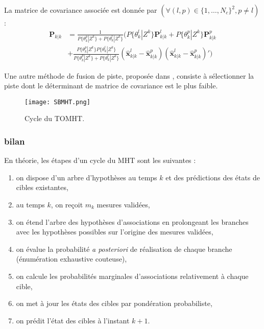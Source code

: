 \documentclass[10pt,french,a4paper]{report}
\begin{document}
La matrice de covariance associée est donnée par $(\forall (l,p) \in \{1,\ldots,N_c\}^2 , p \neq l)$:
\begin{equation}  
 \begin{split}  
 	    \mathbf{P}_{k|k}  &=   \frac{1}{P\{\theta_k^p | Z^k\} + P\{\theta_k^l | Z^k\}} ( P\{\theta_k^l | Z^k\}   \mathbf{P}_{k|k}^l +P\{\theta_k^p | Z^k\}  \mathbf{P}_{k|k}^p \\
 	    &+ \frac{P\{\theta_k^p | Z^k\}  P\{\theta_k^l | Z^k\}}{P\{\theta_k^p | Z^k\} + P\{\theta_k^l | Z^k\}} (\hat{\mathbf{x}}_{k|k}^l - \hat{\mathbf{x}}_{k|k}^p)(\hat{\mathbf{x}}_{k|k}^l - \hat{\mathbf{x}}_{k|k}^p)' )
\end{split}
 \end{equation}

Une autre méthode de fusion de piste, proposée dans \cite{Blackman1986}, consiste à sélectionner la piste dont le déterminant de matrice de covariance est le plus faible. 
\begin{center}
\begin{figure}
\label{fig:MHT}
\texttt{[image: SBMHT.png]} 
\caption{Cycle du \ac{TOMHT}.}
\end{figure}		 
\end{center}		 
		 
\subsubsection{bilan}


En théorie, les étapes d'un cycle du \ac{MHT} sont les suivantes :
\begin{enumerate}[label=\arabic*.]
\item on dispose d'un arbre d'hypothèses au temps $k$ et des prédictions des états de cibles existantes,
\item au temps $k$, on reçoit $m_k$ mesures validées,
\item on étend l'arbre des hypothèses d'associations en prolongeant les branches avec les hypothèses possibles sur l'origine des mesures validées,
\item on évalue la probabilité \textit{a posteriori} de réalisation de chaque branche (énumération exhaustive couteuse),
\item on calcule les probabilités marginales d'associations relativement à chaque cible,
\item on met à jour les états des cibles par pondération probabiliste,
\item on prédit l'état des cibles à l'instant $k + 1$.
\end{enumerate}
\end{document}
